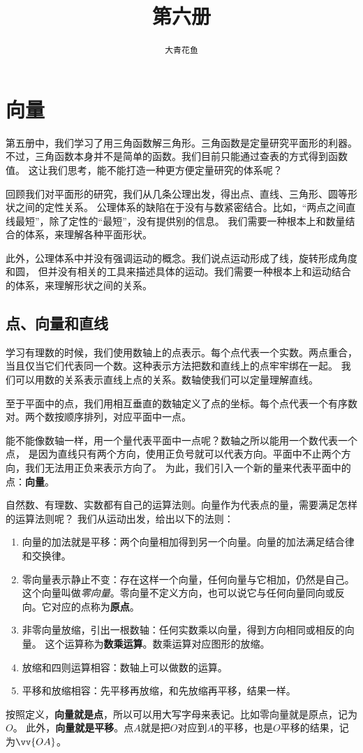 \documentclass[12pt,UTF8]{ctexbook}
\title{\zihao{0} \bfseries 第六册}
\author{\zihao{2} \texttt{大青花鱼}}
\date{}
\begin{document}
\maketitle
\tableofcontents
\newpage

\chapter{向量}

第五册中，我们学习了用三角函数解三角形。三角函数是定量研究平面形的利器。
不过，三角函数本身并不是简单的函数。我们目前只能通过查表的方式得到函数值。
这让我们思考，能不能打造一种更方便定量研究的体系呢？ 

回顾我们对平面形的研究，我们从几条公理出发，得出点、直线、三角形、圆等形状之间的定性关系。
公理体系的缺陷在于没有与数紧密结合。比如，“两点之间直线最短”，除了定性的“最短”，没有提供别的信息。
我们需要一种根本上和数量结合的体系，来理解各种平面形状。

此外，公理体系中并没有强调运动的概念。我们说点运动形成了线，旋转形成角度和圆，
但并没有相关的工具来描述具体的运动。我们需要一种根本上和运动结合的体系，来理解形状之间的关系。

\section{点、向量和直线}
学习有理数的时候，我们使用数轴上的点表示。每个点代表一个实数。两点重合，
当且仅当它们代表同一个数。这种表示方法把数和直线上的点牢牢绑在一起。
我们可以用数的关系表示直线上点的关系。数轴使我们可以定量理解直线。

至于平面中的点，我们用相互垂直的数轴定义了点的坐标。每个点代表一个有序数对。两个数按顺序排列，对应平面中一点。

能不能像数轴一样，用一个量代表平面中一点呢？数轴之所以能用一个数代表一个点，
是因为直线只有两个方向，使用正负号就可以代表方向。平面中不止两个方向，我们无法用正负来表示方向了。
为此，我们引入一个新的量来代表平面中的点：\textbf{向量}。

自然数、有理数、实数都有自己的运算法则。向量作为代表点的量，需要满足怎样的运算法则呢？
我们从运动出发，给出以下的法则：
\begin{enumerate}
    \item 向量的加法就是平移：两个向量相加得到另一个向量。向量的加法满足结合律和交换律。
    \item 零向量表示静止不变：存在这样一个向量，任何向量与它相加，仍然是自己。
    这个向量叫做\textsl{零向量}。零向量不定义方向，也可以说它与任何向量同向或反向。它对应的点称为\textbf{原点}。
    \item 非零向量放缩，引出一根数轴：任何实数乘以向量，得到方向相同或相反的向量。
    这个运算称为\textbf{数乘运算}。数乘运算对应图形的放缩。
    \item 放缩和四则运算相容：数轴上可以做数的运算。
    \item 平移和放缩相容：先平移再放缩，和先放缩再平移，结果一样。
\end{enumerate}
按照定义，\textbf{向量就是点}，所以可以用大写字母来表记。比如零向量就是原点，记为$O$。
此外，\textbf{向量就是平移}。点$A$就是把$O$对应到$A$的平移，也是$O$平移的结果，记为$\vv{OA}$。
\end{document}
